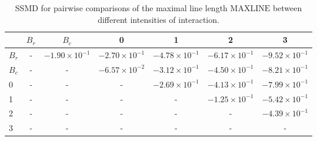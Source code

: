 \begin{table}
\centering
\caption{SSMD for pairwise comparisons of the maximal line length $\text{MAXLINE}$  between different intensities of interaction.}
\label{tab:ssmd_maxline}
\begin{tabular}{lcccccc}
\toprule
 & $B_r$ & $B_c$ & 0 & 1 & 2 & 3 \\
\midrule
$B_r$ & - & $-1.90 \times 10^{-1}$ & $-2.70 \times 10^{-1}$ & $-4.78 \times 10^{-1}$ & $-6.17 \times 10^{-1}$ & $-9.52 \times 10^{-1}$ \\
$B_c$ & - & - & $-6.57 \times 10^{-2}$ & $-3.12 \times 10^{-1}$ & $-4.50 \times 10^{-1}$ & $-8.21 \times 10^{-1}$ \\
0 & - & - & - & $-2.69 \times 10^{-1}$ & $-4.13 \times 10^{-1}$ & $-7.99 \times 10^{-1}$ \\
1 & - & - & - & - & $-1.25 \times 10^{-1}$ & $-5.42 \times 10^{-1}$ \\
2 & - & - & - & - & - & $-4.39 \times 10^{-1}$ \\
3 & - & - & - & - & - & - \\
\bottomrule
\end{tabular}
\end{table}
